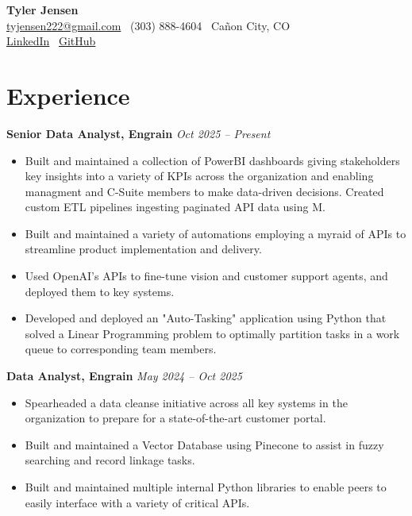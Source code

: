 \documentclass[a4paper,10pt]{article}
\newcommand{\resumeEntry}[2]{%
  \noindent\textbf{#1} \hfill \textit{#2}\par\vspace{-0.5ex}%
}
\begin{document}
\pagestyle{empty}
\small

\begin{center}
    {\LARGE \textbf{Tyler Jensen}}\\[2mm]
    \small
    \href{mailto:tyjensen222@gmail.com}{tyjensen222@gmail.com} \textbullet\ 
    (303) 888-4604 \textbullet\ Ca\~{n}on City, CO \\
    \href{https://www.linkedin.com/in/tyler-jensen-923130181}{LinkedIn} \textbullet\ 
    \href{https://github.com/yourprofile}{GitHub}
\end{center}

\vspace{0.25cm}

\section*{Experience}

\resumeEntry{Senior Data Analyst, Engrain}{Oct 2025 -- Present}
\begin{itemize}[leftmargin=*, noitemsep]
    \item Built and maintained a collection of PowerBI dashboards giving stakeholders key insights into a variety of
    KPIs across the organization and enabling managment and C-Suite members to make data-driven decisions.
    Created custom ETL pipelines ingesting paginated API data using M.
    \item Built and maintained a variety of automations employing a myraid of APIs to streamline product implementation
    and delivery.
    \item Used OpenAI's APIs to fine-tune vision and customer support agents, and deployed them to key systems.
    \item Developed and deployed an "Auto-Tasking" application using Python that solved a Linear Programming problem to optimally
    partition tasks in a work queue to corresponding team members.
\end{itemize}

\resumeEntry{Data Analyst, Engrain}{May 2024 -- Oct 2025}
\begin{itemize}[leftmargin=*, noitemsep]
    \item Spearheaded a data cleanse initiative across all key systems in the organization to prepare for 
    a state-of-the-art customer portal.
    \item Built and maintained a Vector Database using Pinecone to assist in fuzzy searching and record linkage tasks.
    \item Built and maintained multiple internal Python libraries to enable peers to easily interface
    with a variety of critical APIs.
\end{itemize}
\end{document}
